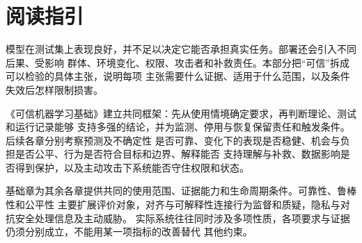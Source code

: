 \chapter*{阅读指引}

模型在测试集上表现良好，并不足以决定它能否承担真实任务。部署还会引入不同后果、受影响
群体、环境变化、权限、攻击者和补救责任。本部分把“可信”拆成可以检验的具体主张，说明每项
主张需要什么证据、适用于什么范围，以及条件失效后怎样限制损害。

《可信机器学习基础》建立共同框架：先从使用情境确定要求，再判断理论、测试和运行记录能够
支持多强的结论，并为监测、停用与恢复保留责任和触发条件。后续各章分别考察预测及不确定性
是否可靠、变化下的表现是否稳健、机会与负担是否公平、行为是否符合目标和边界、解释能否
支持理解与补救、数据影响是否得到保护，以及主动攻击下系统能否守住权限和状态。

基础章为其余各章提供共同的使用范围、证据能力和生命周期条件。可靠性、鲁棒性和公平性
主要扩展评价对象，对齐与可解释性连接行为监督和质疑，隐私与对抗安全处理信息及主动威胁。
实际系统往往同时涉及多项性质，各项要求与证据仍须分别成立，不能用某一项指标的改善替代
其他约束。
